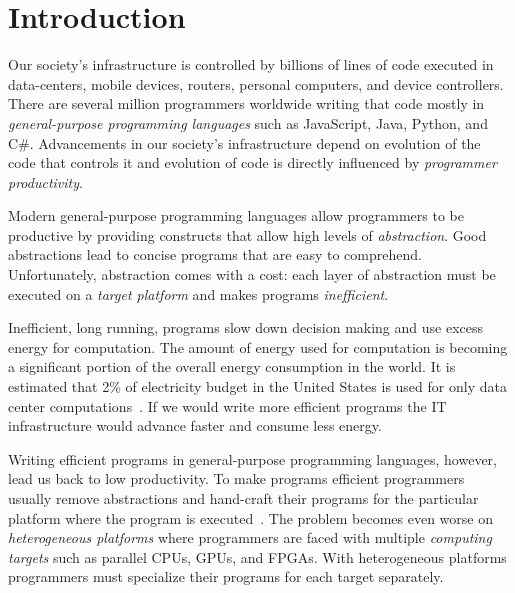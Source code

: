 \chapter{Introduction}
\label{sct:introduction}

Our society's infrastructure is controlled by billions of lines of code executed in data-centers,
 mobile devices, routers, personal computers, and device controllers. There are
 several million programmers worldwide writing that code mostly
 in \emph{general-purpose programming languages} such as JavaScript, Java, Python,
 and C\#. Advancements in our society's infrastructure depend on evolution of the code that controls it
 and evolution of code is directly influenced by \emph{programmer productivity}.


Modern general-purpose programming languages allow programmers to be productive by
 providing constructs that allow high levels of \emph{abstraction}. Good abstractions lead to
 concise programs that are easy to comprehend. Unfortunately, abstraction comes with a cost: each layer of
 abstraction must be executed on a \emph{target platform} and makes programs \emph{inefficient}.

Inefficient, long running, programs slow down decision making and use excess energy
 for computation. The amount of energy used for computation is becoming a significant
 portion of the overall energy consumption in the world. It is estimated that 2\% of
 electricity budget in the United States is used for only data center computations~\cite{mukherjee2009spatio}. If
 we would write more efficient programs the IT infrastructure would advance faster and consume less energy.

Writing efficient programs in general-purpose programming languages, however, lead us back to
 low productivity. To make programs efficient programmers usually remove abstractions and
 hand-craft their programs for the particular platform where the program is executed~\cite{lee2011implementing}.
 The problem becomes even worse on \emph{heterogeneous platforms} where programmers are faced with multiple \emph{computing targets} such as parallel CPUs, GPUs, and FPGAs. With heterogeneous platforms programmers must specialize their programs for each target separately.

